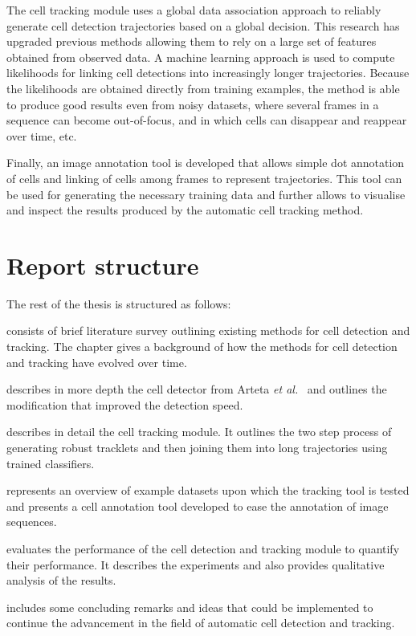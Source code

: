 		The cell tracking module uses a global data association approach to reliably generate cell detection trajectories based on a global decision. This research has upgraded previous methods allowing them to rely on a large set of features obtained from observed data. A machine learning approach is used to compute likelihoods for linking cell detections into increasingly longer trajectories. Because the likelihoods are obtained directly from training examples, the method is able to produce good results even from noisy datasets, where several frames in a sequence can become out-of-focus, and in which cells can disappear and reappear over time, etc.
		
		Finally, an image annotation tool is developed that allows simple dot annotation of cells and linking of cells among frames to represent trajectories. This tool can be used for generating the necessary training data and further allows to visualise and inspect the results produced by the automatic cell tracking method.
		
	\section{Report structure \statusfirstdraft}
		The rest of the thesis is structured as follows:
		
		 consists of brief literature survey outlining existing methods for cell detection and tracking. The chapter gives a background of how the methods for cell detection and tracking have evolved over time.
		
		 describes in more depth the cell detector from Arteta \emph{et al.}~\cite{arteta12} and outlines the modification that improved the detection speed.
		
		 describes in detail the cell tracking module. It outlines the two step process of generating robust tracklets and then joining them into long trajectories using trained classifiers.
	
		 represents an overview of example datasets upon which the tracking tool is tested and presents a cell annotation tool developed to ease the annotation of image sequences.
		
		 evaluates the performance of the cell detection and tracking module to quantify their performance. It describes the experiments and also provides qualitative analysis of the results.
		
		 includes some concluding remarks and ideas that could be implemented to continue the advancement in the field of automatic cell detection and tracking.